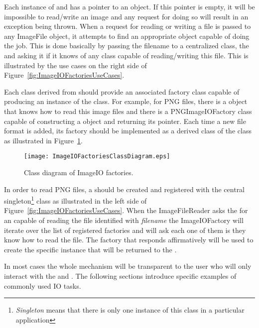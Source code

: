Each instance of  and 
has a pointer to an  object. If this pointer is empty, it will be
impossible to read/write an image and any request for doing so will result in
an exception being thrown. When a request for reading or writing a file is
passed to any ImageFile object, it attempts to find an appropriate
 object capable of doing the job. This is done basically by
passing the filename to a centralized class, the  and
asking it if it knows of any  class capable of reading/writing
this file. This is illustrated by the use cases on the right side of
Figure~\ref{fig:ImageIOFactoriesUseCases}.

Each class derived from  should provide an associated
factory class capable of producing an instance of the  class. For
example, for PNG files, there is a  object that knows how
to read this image files and there is a PNGImageIOFactory class capable of
constructing a  object and returning its pointer. Each time a
new file format is added, its factory should be implemented as a derived class
of the  class as illustrated in
Figure~\ref{fig:ImageIOFactoriesClassDiagram}. 

\begin{figure}
\center
\texttt{[image: ImageIOFactoriesClassDiagram.eps]}
\caption{Class diagram of ImageIO factories.}
\label{fig:ImageIOFactoriesClassDiagram}
\end{figure}

In order to read PNG files, a  should be created and
registered with the central 
singleton\footnote{\emph{Singleton} means that there is only one instance of
this class in a particular application} class as illustrated in the left side
of Figure~\ref{fig:ImageIOFactoriesUseCases}. When the ImageFileReader asks the
 for an  capable of reading the file
identified with \emph{filename} the ImageIOFactory will iterate over the list
of registered factories and will ask each one of them is they know how to read
the file. The factory that responds affirmatively will be used to create the
specific  instance that will be returned to the
.

In most cases the whole mechanism will be transparent to the user who will only
interact with the  and . The following
sections introduce specific examples of commonly used IO tasks. 







